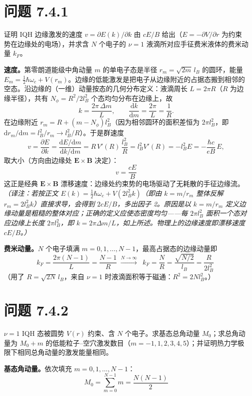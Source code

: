 \section*{问题 7.4.1}
\begin{problem}
证明 IQH 边缘激发的速度 $v=\partial E(k)/\partial k$ 由 $cE/B$ 给出（$E=-\partial V/\partial r$ 为约束势在边缘处的电场），并求含 $N$ 个电子的 $\nu=1$ 液滴所对应手征费米液体的费米动量 $k_F$。
\end{problem}
\solution
\textbf{速度。}第零朗道能级中角动量 $m$ 的单电子态是半径 $r_m=\sqrt{2m}\,l_B$ 的圆环，能量 $E_m=\frac12\hbar\omega_c+V(r_m)$。边缘的低能激发是把电子从边缘附近的占据态搬到相邻的空态。沿边缘的（一维）动量按态的几何分布定义：液滴周长 $L=2\pi R$（$R$ 为边缘半径），共有 $N_\phi=R^2/2l_B^2$ 个态均匀分布在边缘上，故
\begin{equation*}
k=\frac{2\pi\,\Delta m}{L},\qquad
\frac{\mathrm{d}k}{\mathrm{d}m}=\frac{2\pi}{L}=\frac1R .
\end{equation*}
在边缘附近 $r_m=R+(m-N_\phi)l_B^2$（因为相邻圆环的面积差恒为 $2\pi l_B^2$，即 $\mathrm{d}r_m/\mathrm{d}m=l_B^2/r_m\to l_B^2/R$）。于是群速度
\begin{equation*}
v=\frac{\partial E}{\partial k}
=\frac{\mathrm{d}E/\mathrm{d}m}{\mathrm{d}k/\mathrm{d}m}
=R\,V'(R)\,\frac{l_B^2}{R}
=l_B^2V'(R)
=-l_B^2E
=-\frac{\hbar c}{eB}\,E ,
\end{equation*}
取大小（方向由边缘处 $\pmb{E}\times\pmb{B}$ 决定）：
\begin{equation*}
\boxed{\;v=\frac{cE}{B}\;}
\end{equation*}
这正是经典 $\pmb{E}\times\pmb{B}$ 漂移速度：边缘处约束势的电场驱动了无耗散的手征边缘流。
\emph{（译注：若按正文 $E(k)=\frac12\hbar\omega_c+V(2l_B^2k)$（即由 $k=m/r_m$ 整体反解 $r_m=2l_B^2k$）直接求导，会得到 $2cE/B$，多出因子 2。原因是以 $k=m/r_m$ 定义边缘动量是粗糙的整体对应；正确的定义应使态密度均匀——每 $2\pi l_B^2$ 面积一个态对应边缘上长度 $2\pi l_B^2$，即 $k=2\pi\Delta m/L$，如上所述。物理上的边缘速度即漂移速度 $cE/B$。）}

\textbf{费米动量。}$N$ 个电子填满 $m=0,1,\dots,N-1$，最高占据态的边缘动量即
\begin{equation*}
k_F=\frac{2\pi(N-1)}{L}=\frac{N-1}{R}
\;\xrightarrow{N\to\infty}\;
\boxed{\;k_F=\frac{N}{R}=\frac{\sqrt{N/2}}{l_B}=\frac{R}{2l_B^2}\;}
\end{equation*}
（用了 $R=\sqrt{2N}\,l_B$，来自 $\nu=1$ 时液滴面积等于磁通：$R^2=2Nl_B^2$。）

\section*{问题 7.4.2}
\begin{problem}
$\nu=1$ IQH 态被圆势 $V(r)$ 约束、含 $N$ 个电子。求基态总角动量 $M_0$；求总角动量为 $M_0+m$ 的低能粒子--空穴激发数目（$m=-1,1,2,3,4,5$）；并证明热力学极限下相同总角动量的激发能量相同。
\end{problem}
\solution
\textbf{基态角动量。}依次填充 $m=0,1,\dots,N-1$：
\begin{equation*}
\boxed{\;M_0=\sum_{m=0}^{N-1}m=\frac{N(N-1)}{2}\;}
\end{equation*}

